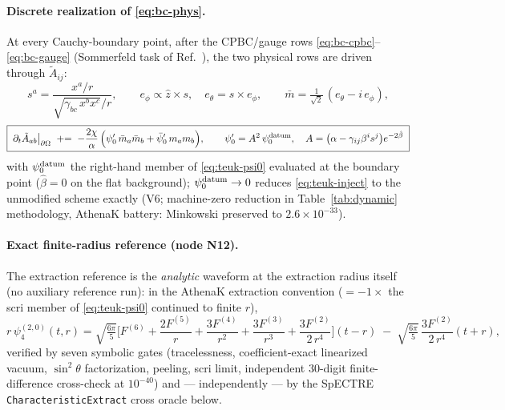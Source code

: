 \begin{nfblock}
\paragraph{Discrete realization of \eqref{eq:bc-phys}.}
At every Cauchy-boundary point, after the CPBC/gauge rows
\eqref{eq:bc-cpbc}--\eqref{eq:bc-gauge} (Sommerfeld task of
Ref.~\cite{Zhu:2024utz}), the two physical rows are driven through
$\tilde A_{ij}$:
\begin{equation}
s^a = \frac{x^a/r}{\sqrt{\gamma_{bc}\,x^b x^c}/r},
\qquad
e_\phi \propto \hat z\times s,\quad e_\theta = s\times e_\phi,
\qquad
\bar m = \tfrac{1}{\sqrt 2}\,(e_\theta - i\,e_\phi),
\label{eq:teuk-dyad}
\end{equation}
\begin{equation}
\boxed{\;
\partial_t \tilde A_{ab}\big|_{\partial\Omega}
\;\mathrel{+}=\;
-\frac{2\chi}{\alpha}\,
\Big(\psi_0'\,\bar m_a \bar m_b + \bar\psi_0'\,m_a m_b\Big),
\qquad
\psi_0' = A^2\,\psi_0^{\rm datum},
\quad A = \big(\alpha-\gamma_{ij}\beta^i s^j\big)e^{-2\hat\beta}
\;}
\label{eq:teuk-inject}
\end{equation}
with $\psi_0^{\rm datum}$ the right-hand member of \eqref{eq:teuk-psi0}
evaluated at the boundary point ($\hat\beta=0$ on the flat background);
$\psi_0^{\rm datum}\to0$ reduces \eqref{eq:teuk-inject} to the unmodified
scheme exactly (V6; machine-zero reduction in Table~\ref{tab:dynamic}
methodology, AthenaK battery: Minkowski preserved to $2.6\times10^{-33}$).

\paragraph{Exact finite-radius reference (node N12).}
The extraction reference is the \emph{analytic} waveform at the
extraction radius itself (no auxiliary reference run): in the AthenaK
extraction convention ($=-1\times$ the scri member of
\eqref{eq:teuk-psi0} continued to finite $r$),
\begin{equation}
r\,\psi_4^{(2,0)}(t,r) =
\sqrt{\tfrac{6\pi}{5}}\Big[F^{(6)} + \frac{2F^{(5)}}{r}
 + \frac{3F^{(4)}}{r^{2}} + \frac{3F^{(3)}}{r^{3}}
 + \frac{3F^{(2)}}{2\,r^{4}}\Big](t-r)
\;-\; \sqrt{\tfrac{6\pi}{5}}\,\frac{3F^{(2)}}{2\,r^{4}}(t+r),
\label{eq:teuk-exact-psi4}
\end{equation}
verified by seven symbolic gates (tracelessness, coefficient-exact
linearized vacuum, $\sin^2\theta$ factorization, peeling, scri limit,
independent $30$-digit finite-difference cross-check at $10^{-40}$) and
— independently — by the SpECTRE \texttt{CharacteristicExtract} cross
oracle below.


\end{nfblock}
